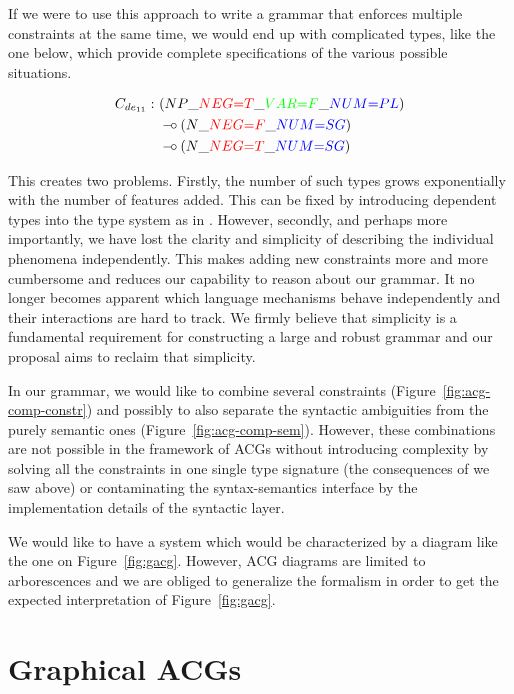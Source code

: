 \documentclass[twocolumn]{article}
\def\limp {\mathbin{{-}\mkern-3.5mu{\circ}}}
\begin{document}
If we were to use this approach to write a grammar that enforces multiple
constraints at the same time, we would end up with complicated types, like the
one below, which provide complete specifications of the various possible
situations.

\begin{align*}
C_{de_{11}} :\ &(NP\_\textcolor{red}{NEG{=}T}\_\textcolor{green}{VAR{=}F}\_\textcolor{blue}{NUM{=}PL}) \\
&\limp (N\_\textcolor{red}{NEG{=}F}\_\textcolor{blue}{NUM{=}SG}) \\
&\limp (N\_\textcolor{red}{NEG{=}T}\_\textcolor{blue}{NUM{=}SG})
\end{align*}

This creates two problems. Firstly, the number of such types grows
exponentially with the number of features added. This can be fixed by
introducing dependent types into the type system as in
\cite{de2007type}. However, secondly, and perhaps more importantly, we have
lost the clarity and simplicity of describing the individual phenomena
independently. This makes adding new constraints more and more cumbersome and
reduces our capability to reason about our grammar. It no longer becomes
apparent which language mechanisms behave independently and their interactions
are hard to track. We firmly believe that simplicity is a fundamental
requirement for constructing a large and robust grammar and our proposal aims
to reclaim that simplicity.

In our grammar, we would like to combine several constraints
(Figure~\ref{fig:acg-comp-constr}) and possibly to also separate the syntactic
ambiguities from the purely semantic ones (Figure~\ref{fig:acg-comp-sem}).
However, these combinations are not possible in the framework of ACGs without
introducing complexity by solving all the constraints in one single type
signature (the consequences of we saw above) or contaminating the
syntax-semantics interface by the implementation details of the syntactic
layer.

We would like to have a system which would be characterized by a diagram like
the one on Figure~\ref{fig:gacg}. However, ACG diagrams are limited to
arborescences and we are obliged to generalize the formalism in order to get
the expected interpretation of Figure~\ref{fig:gacg}.


\section{Graphical ACGs}
\end{document}
